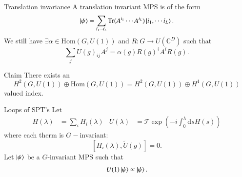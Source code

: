 \documentclass{beamer}
\newcommand{\CC}{\mathbb{C}}
\newcommand{\dd}{\mathrm{d}}
\begin{document}
\begin{frame}{Translation invariance}
A translation invariant MPS is of the form
\[\ket{\psi}=\sum_{i_1\cdots i_L}\textrm{Tr}(A^{i_1}\cdots A^{i_L})\ket{i_1,\cdots i_L}.\]
\pause
We still have $\exists \alpha\in\text{Hom}(G,U(1))$ and $R:G\rightarrow U(\CC^D)$ such that
 \[\sum_j U(g)_{ij}A^j=\alpha(g) R(g)^\dagger A^i R(g).\]
\pause
\begin{block}{Claim}
There exists an
\[H^2(G,U(1))\oplus \text{Hom}(G,U(1))=H^2(G,U(1))\oplus H^1(G,U(1))\]
valued index.
\end{block}
\end{frame}

\begin{frame}{Loops of SPT's}
Let
\begin{align}
H(\lambda)&= \sum_i H_i(\lambda)&U(\lambda)&= \mathcal{T}\exp(-i\int_0^\lambda \dd s H(s))
\end{align}
where each therm is $G-$invariant:
\[[H_i(\lambda),\tilde{U}(g)]=0.\]
\pause
Let $\ket{\psi}$ be a $G$-invariant MPS such that
\[U(1)\ket{\psi}\propto \ket{\psi}.\]
\end{frame}
\end{document}
